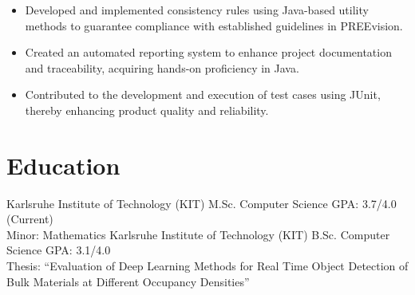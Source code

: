 \documentclass[11pt, letterpaper]{moderncv}
\newcommand{\de}[1]{}
\newcommand{\en}[1]{#1}
\newcommand{\de}[1]{#1}
\newcommand{\en}[1]{}
\newcommand{\quotes}[1]{\en{``#1''}\de{\glqq{}#1\grqq{}}}
\begin{document}
        {\en{
        \begin{itemize}%
            \item Developed and implemented consistency rules using Java-based utility methods to guarantee compliance with established guidelines in PREEvision.
            \item Created an automated reporting system to enhance project documentation and traceability, acquiring hands-on proficiency in Java.
            \item Contributed to the development and execution of test cases using JUnit, thereby enhancing product quality and reliability.
        \end{itemize}}
        \de{
        \begin{itemize}
            \item Entwicklung von Konsistenzregeln unter Verwendung von Java-basierten Dienstprogrammen, um die Einhaltung der festgelegten Richtlinien in der modellbasierten Entwicklungsumgebung PREEvision zu gewährleisten.
            \item Erstellung und Pflege eines umfassenden Berichts zur Darstellung von Anforderungen in PREEvision zur Verbesserung der Projektdokumentation und Rückverfolgbarkeit.
            \item Mitwirkung an der Entwicklung und Ausführung von Testfällen unter Verwendung von JUnit zur Verbesserung der Produktqualität und Zuverlässigkeit.
        \end{itemize}}
        }

\section{\en{Education}\de{Ausbildung}}
\cventry{2022-\en{today}\de{heute}}
        {\en{Karlsruhe Institute of Technology (KIT)}\de{Karlsruher Institut für Technologie (KIT)}}
        {M.Sc. \en{Computer Science}\de{Informatik}}
        {}
        {}
        {\en{GPA: 3.7/4.0 (Current)}\de{Durchschnittsnote: 1,3}\\
        \en{Minor: Mathematics}\de{Nebenfach: Mathematik}}
        {\en{Karlsruhe Institute of Technology (KIT)}\de{Karlsruher Institut für Technologie (KIT)}}
        {B.Sc. \en{Computer Science}\de{Informatik}}
        {}
        {}
        {\en{GPA: 3.1/4.0}\de{Durchschnittsnote: 1,9}\\
        Thesis:
        \en{\quotes{Evaluation of Deep Learning Methods for Real Time Object Detection of Bulk Materials at Different Occupancy Densities}}
        \de{\quotes{Evaluation von Deep Learning Verfahren zur echtzeitfähigen Objektdetektion von Schüttgütern bei verschiedenen Belegungsdichten}}\\}
\end{document}
